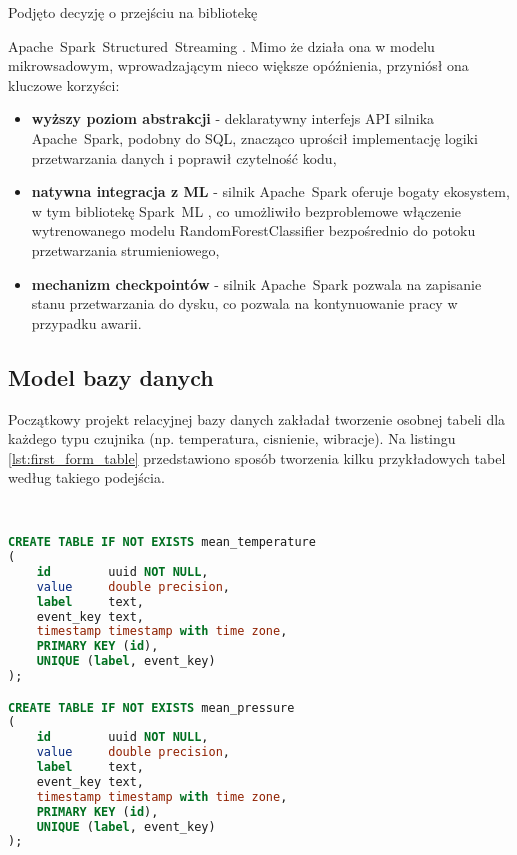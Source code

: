 Podjęto decyzję o przejściu na bibliotekę {\mbox{Apache Spark Structured Streaming} \cite{spark_streaming}. Mimo że działa ona w modelu mikrowsadowym, wprowadzającym nieco większe opóźnienia, przyniósł ona kluczowe korzyści:

\vspace{0.3em}

\begin{itemize}
    \item \textbf{wyższy poziom abstrakcji} - deklaratywny interfejs API silnika \mbox{Apache Spark}, podobny do SQL, znacząco uprościł implementację logiki przetwarzania danych i poprawił czytelność kodu,
    \item \textbf{natywna integracja z ML} - silnik \mbox{Apache Spark} oferuje bogaty ekosystem, w tym bibliotekę \mbox{Spark ML} \cite{spark_streaming}, co umożliwiło bezproblemowe włączenie wytrenowanego modelu RandomForestClassifier bezpośrednio do potoku przetwarzania strumieniowego,
    \item \textbf{mechanizm checkpointów} - silnik \mbox{Apache Spark} pozwala na zapisanie stanu przetwarzania do dysku, co pozwala na kontynuowanie pracy w przypadku awarii.
\end{itemize}

\subsection{Model bazy danych}

Początkowy projekt relacyjnej bazy danych zakładał tworzenie osobnej tabeli dla każdego typu czujnika (np. temperatura, cisnienie, wibracje). Na listingu \ref{lst:first_form_table} przedstawiono sposób tworzenia kilku przykładowych tabel według takiego podejścia.

\begin{lstlisting}[caption=Pierwsza forma tabeli w relacyjnej bazie danych, label={lst:first_form_table},language=SQL]


CREATE TABLE IF NOT EXISTS mean_temperature
(
    id        uuid NOT NULL,
    value     double precision,
    label     text,
    event_key text,
    timestamp timestamp with time zone,
    PRIMARY KEY (id),
    UNIQUE (label, event_key)
);

CREATE TABLE IF NOT EXISTS mean_pressure
(
    id        uuid NOT NULL,
    value     double precision,
    label     text,
    event_key text,
    timestamp timestamp with time zone,
    PRIMARY KEY (id),
    UNIQUE (label, event_key)
);


\end{lstlisting}}
